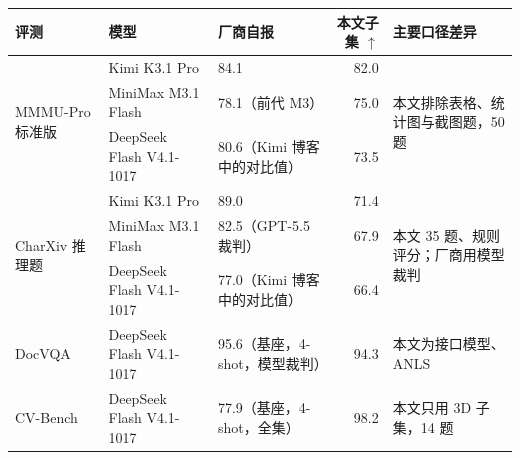 \begin{tabular}{lllrl}
\toprule
评测 & 模型 & 厂商自报 & 本文子集 $\uparrow$ & 主要口径差异 \\
\midrule
\multirow{3}{*}{MMMU-Pro 标准版} & Kimi K3.1 Pro & 84.1 & 82.0 & \multirow{3}{*}{\parbox{4.2cm}{\raggedright 本文排除表格、统计图与截图题，50 题}} \\
 & MiniMax M3.1 Flash & 78.1（前代 M3） & 75.0 &  \\
 & DeepSeek Flash V4.1-1017 & 80.6（Kimi 博客中的对比值） & 73.5 &  \\
\midrule
\multirow{3}{*}{CharXiv 推理题} & Kimi K3.1 Pro & 89.0 & 71.4 & \multirow{3}{*}{\parbox{4.2cm}{\raggedright 本文 35 题、规则评分；厂商用模型裁判}} \\
 & MiniMax M3.1 Flash & 82.5（GPT-5.5 裁判） & 67.9 &  \\
 & DeepSeek Flash V4.1-1017 & 77.0（Kimi 博客中的对比值） & 66.4 &  \\
\midrule
\multirow{1}{*}{DocVQA} & DeepSeek Flash V4.1-1017 & 95.6（基座，4-shot，模型裁判） & 94.3 & \multirow{1}{*}{\parbox{4.2cm}{\raggedright 本文为接口模型、ANLS}} \\
\midrule
\multirow{1}{*}{CV-Bench} & DeepSeek Flash V4.1-1017 & 77.9（基座，4-shot，全集） & 98.2 & \multirow{1}{*}{\parbox{4.2cm}{\raggedright 本文只用 3D 子集，14 题}} \\
\bottomrule
\end{tabular}
